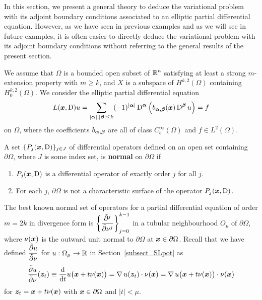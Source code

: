 In this section, we present a general theory to deduce the variational
problem with its adjoint boundary conditions associated to an elliptic partial
differential equation.  However, as we have seen in previous examples
and as we will see in future examples, it is often easier to directly 
deduce the variational problem with its adjoint boundary conditions
without referring to the general results of the present section.

We assume that $\Omega$ is a bounded open
subset of $\displaystyle \RR^n$ satisfying at least a strong
$m$-extension property with $m\geq k$, and $X$ is a subspace of
$\displaystyle H^{k,2}(\Omega)$ containing
$\displaystyle H^{k,2}_0(\Omega)$.  We consider the elliptic partial 
differential equation
\[
L(\VEC{x}, \diff)u = \sum_{|\VEC{\alpha}|,|\VEC{\beta}|\leq k}
(-1)^{|\VEC{\alpha}|} \diff^{\VEC{\alpha}}
\left( b_{\VEC{\alpha},\VEC{\beta}}(\VEC{x}) \diff^{\VEC{\beta}} u\right) = f
\]
on $\Omega$, where the coefficients $b_{\VEC{\alpha},\VEC{\beta}}$ are
all of class $\displaystyle C^\infty_b(\Omega)$ and $f\in L^2(\Omega)$.

\begin{defn}
A set $\{P_j(\VEC{x},\diff) \}_{j\in J}$ of differential operators defined
on an open set containing $\partial \Omega$, where $J$ is some index set, is
{\bfseries normal} on
$\partial \Omega$ if
\begin{enumerate}
\item $P_j(\VEC{x},\diff)$ is a differential operator of exactly order $j$
for all $j$. 
\item For each $j$, $\partial \Omega$ is not a characteristic surface
of the operator $P_j(\VEC{x},\diff)$.
\end{enumerate}
\end{defn}

The best known normal set of operators for a partial differential
equation of order $m=2k$ in divergence form is
$\displaystyle \left\{ \pdydxnS{}{\nu}{j} \right\}_{j=0}^{k-1}$
in a tubular neighbourhood $O_\mu$ of $\partial \Omega$,
where $\nu(\VEC{x})$ is the outward unit normal to
$\partial \Omega$ at $\VEC{x}\in \partial \Omega$.
Recall that we have defined $\displaystyle \pdydxS{u}{\nu}$
for $u:\Omega_\mu \to \RR$ in Section~\ref{subsect_SLpot} as
\[
\pdydxS{u}{\nu}(\VEC{z}_t)
\equiv \dfdx{u\big(\VEC{x}+t\nu(\VEC{x})\big)}{t}
= \graD u(\VEC{z}_t) \cdot \nu(\VEC{x})
= \graD u\big(\VEC{x}+t\nu(\VEC{x})\big) \cdot \nu(\VEC{x})
\]
for $\VEC{z}_t = \VEC{x} + t\nu(\VEC{x})$ with $\VEC{x} \in \partial \Omega$
and $|t|< \mu$.

